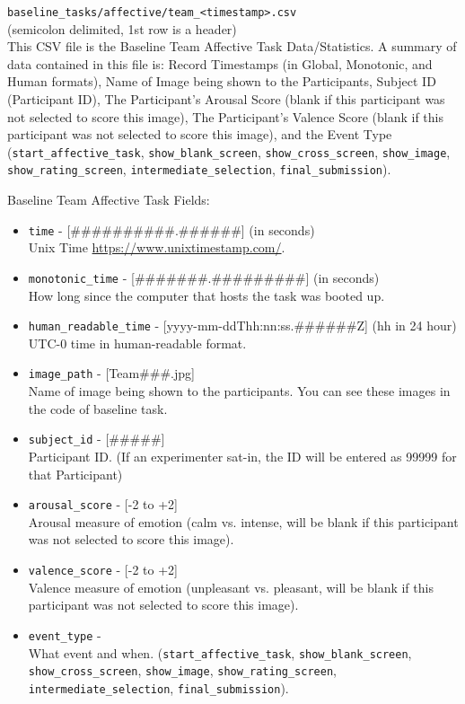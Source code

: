 \begin{description}
\medskip
\item\verb|baseline_tasks/affective/team_<timestamp>.csv|\\(semicolon delimited, 1st row is a header)\\
This CSV file is the Baseline Team Affective Task Data/Statistics. A summary of data contained in this file is: Record Timestamps (in Global, Monotonic, and Human formats), Name of Image being shown to the Participants, Subject ID (Participant ID), The Participant's Arousal Score (blank if this participant was not selected to score this image), The Participant's Valence Score (blank if this participant was not selected to score this image), and the Event Type
(\verb|start_affective_task|, \verb|show_blank_screen|,
\verb|show_cross_screen|, \verb|show_image|, \verb|show_rating_screen|,
\verb|intermediate_selection|, \verb|final_submission|).

Baseline Team Affective Task Fields:
\begin{itemize}
    \item \verb|time| - [\#\#\#\#\#\#\#\#\#\#.\#\#\#\#\#\#] (in seconds)\\Unix Time \href{https://www.unixtimestamp.com/}{https://www.unixtimestamp.com/}.
    \item \verb|monotonic_time| - [\#\#\#\#\#\#\#.\#\#\#\#\#\#\#\#\#] (in seconds)\\How long since the computer that hosts the task was booted up.
    \item \verb|human_readable_time| - [yyyy-mm-ddThh:nn:ss.\#\#\#\#\#\#Z] (hh in 24 hour)\\ UTC-0 time in human-readable format.
    \item \verb|image_path| - [Team\#\#\#.jpg]\\Name of image being shown to the participants. You can see these images in the code of baseline task.
    \item \verb|subject_id| - [\#\#\#\#\#]\\Participant ID. (If an experimenter sat-in, the ID will be entered as 99999 for that Participant)
    \item \verb|arousal_score| - [-2 to +2]\\Arousal measure of emotion (calm vs. intense, will be blank if this participant was not selected to score this image).
    \item \verb|valence_score| - [-2 to +2]\\Valence measure of emotion (unpleasant vs. pleasant, will be blank if this participant was not selected to score this image).
    \item \verb|event_type| -\\What event and when.
        (\verb|start_affective_task|, \verb|show_blank_screen|,
        \verb|show_cross_screen|, \verb|show_image|, \verb|show_rating_screen|,
        \verb|intermediate_selection|, \verb|final_submission|).
\end{itemize}



\end{description}
